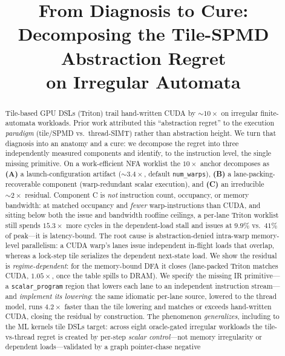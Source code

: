 \documentclass[conference]{IEEEtran}
\begin{document}
\title{From Diagnosis to Cure:\\
Decomposing the Tile-SPMD Abstraction Regret\\
on Irregular Automata}
\author{}
\maketitle

\begin{abstract}
Tile-based GPU DSLs (Triton) trail hand-written CUDA by ${\sim}10\times$ on irregular
finite-automata workloads. Prior work attributed this ``abstraction regret'' to the execution
\emph{paradigm} (tile/SPMD vs.\ thread-SIMT) rather than abstraction height. We turn that diagnosis
into an anatomy and a cure: we decompose the regret into three independently measured components and
identify, to the instruction level, the single missing primitive. On a work-efficient NFA worklist
the $10\times$ anchor decomposes as \textbf{(A)} a launch-configuration artifact (${\sim}3.4\times$,
default \texttt{num\_warps}), \textbf{(B)} a lane-packing-recoverable component (warp-redundant scalar
execution), and \textbf{(C)} an irreducible ${\sim}2\times$ residual. Component C is \emph{not}
instruction count, occupancy, or memory bandwidth: at matched occupancy and \emph{fewer}
warp-instructions than CUDA, and sitting below both the issue and bandwidth roofline ceilings, a
per-lane Triton worklist still spends $15.3\times$ more cycles in the dependent-load stall and issues
at $9.9\%$ vs.\ $41\%$ of peak---it is latency-bound. The root cause is abstraction-denied
intra-warp memory-level parallelism: a CUDA warp's lanes issue independent in-flight loads that
overlap, whereas a lock-step tile serializes the dependent next-state load. We show the residual is
\emph{regime-dependent}: for the memory-bound DFA it closes (lane-packed Triton matches CUDA,
$1.05\times$, once the table spills to DRAM). We specify the missing IR primitive---a
\texttt{scalar\_program} region that lowers each lane to an independent instruction stream---and
\emph{implement its lowering}: the same idiomatic per-lane source, lowered to the thread model, runs
$4.2\times$ faster than the tile lowering and matches or exceeds hand-written CUDA, closing the
residual by construction. The phenomenon \emph{generalizes}, including to the ML kernels tile DSLs target: across eight
oracle-gated irregular workloads the tile-vs-thread regret is created by per-step \emph{scalar
control}---not memory irregularity or dependent loads---validated by a graph pointer-chase negative

\end{abstract}
\end{document}
